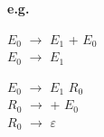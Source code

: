\documentclass[\main/ApuntesPL.tex]{subfiles}
\begin{document}
      \bigskip
      \par
      \textbf{e.g.}
      \begin{center}
        \begin{minipage}{.3\textwidth}
          \hspace*{5mm}$E_0$ $\rightarrow$ {\color{red}$E_1$} + $E_0$\\
          \hspace*{5mm}$E_0$ $\rightarrow$ {\color{red}$E_1$}\\
        \end{minipage}%
        \begin{minipage}{.5\textwidth}
          \hspace*{5mm}$E_0$ $\rightarrow$ $E_1$ $R_0$\\
          \hspace*{5mm}$R_0$ $\rightarrow$ + $E_0$\\
          \hspace*{5mm}$R_0$ $\rightarrow$ $\varepsilon$\\
        \end{minipage}
      \end{center}
\end{document}
